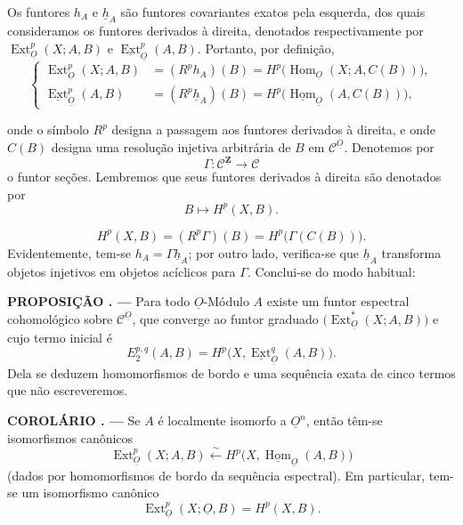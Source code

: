 \documentclass[11pt,twoside,openany]{book}
\numberwithin{equation}{section}
\newcommand{\src}[1]{%
  \phantomsection\hypertarget{src:#1}{}%
  \marginpar{\raggedleft\footnotesize\sffamily #1}%
}
\newcommand{\Osh}{\underline{O}}
\newcommand{\Zsh}{\underline{\mathbf Z}}
\newcommand{\Ccat}{\mathcal C}
\newcommand{\Homsh}{\underline{\operatorname{Hom}}}
\newcommand{\Extsh}{\underline{\operatorname{Ext}}}
\newcommand{\hsh}{\underline{h}}
\newcommand{\fquote}[1]{\textquotedbl#1\textquotedbl}
\theoremstyle{plain}
\theoremstyle{definition}
\theoremstyle{remark}
\newcommand{\result}[2]{%
  \par\medskip\noindent\textbf{#1%
  \if\relax\detokenize{#2}\relax\else\space#2\fi. ---}\enspace
}
\newcommand{\FgaUnitKey}{frontmatter}
\renewcommand{\src}[1]{%
  \phantomsection\hypertarget{src:\FgaUnitKey:#1}{}%
  \marginpar{\raggedleft\footnotesize\sffamily #1}%
}
\begin{document}
Os funtores $h_A$ e $\hsh_A$ são funtores covariantes exatos pela esquerda,
dos quais consideramos os funtores derivados à direita, denotados respectivamente por
$\operatorname{Ext}_{\Osh}^{p}(X;A,B)$ e $\Extsh_{\Osh}^{p}(A,B)$. Portanto,
por definição,
\begin{equation}\tag{1.2}
\left\{
\begin{aligned}
\operatorname{Ext}_{\Osh}^{p}(X;A,B)
  &= (R^{p}h_A)(B)
   = H^{p}\bigl(\operatorname{Hom}_{\Osh}(X;A,C(B))\bigr),\\
\Extsh_{\Osh}^{p}(A,B)
  &= (R^{p}\hsh_A)(B)
   = H^{p}\bigl(\Homsh_{\Osh}(A,C(B))\bigr),
\end{aligned}
\right.
\end{equation}

onde o símbolo $R^{p}$ designa a passagem aos funtores derivados à direita, e onde
$C(B)$ designa uma resolução injetiva arbitrária de $B$ em $\Ccat^{\Osh}$.
Denotemos por
\[
  \Gamma:\Ccat^{\Zsh}\longrightarrow\Ccat
\]
o funtor \fquote{seções}. Lembremos que seus funtores derivados à direita são
denotados por
\[
  B\longmapsto H^{p}(X,B).
\]

\src{170}
\begin{equation}\tag{1.3}
  H^{p}(X,B)=(R^{p}\Gamma)(B)=H^{p}\bigl(\Gamma(C(B))\bigr).
\end{equation}
Evidentemente, tem-se $h_A=\Gamma\hsh_A$; por outro lado, verifica-se que $\hsh_A$
transforma objetos injetivos em objetos acíclicos para $\Gamma$. Conclui-se do
modo habitual:

\result{PROPOSIÇÃO}{1} Para todo $\Osh$-Módulo $A$ existe um funtor
espectral cohomológico sobre $\Ccat^{\Osh}$, que converge ao funtor graduado
$\bigl(\operatorname{Ext}_{\Osh}^{*}(X;A,B)\bigr)$ e cujo termo inicial é
\begin{equation}\tag{1.4}
  E_{2}^{p,q}(A,B)=H^{p}\bigl(X,\Extsh_{\Osh}^{q}(A,B)\bigr).
\end{equation}
Dela se deduzem \fquote{homomorfismos de bordo} e uma sequência exata de cinco termos
que não escreveremos.

\result{COROLÁRIO}{1} Se $A$ é localmente isomorfo a $\Osh^{n}$, então têm-se
isomorfismos canônicos
\begin{equation}\tag{1.5}
  \operatorname{Ext}_{\Osh}^{p}(X;A,B)
  \overset{\sim}{\longleftarrow}
  H^{p}\bigl(X,\Homsh_{\Osh}(A,B)\bigr)
\end{equation}
(dados por homomorfismos de bordo da sequência espectral). Em particular, tem-se
um isomorfismo canônico
\begin{equation}\tag{1.6}
  \operatorname{Ext}_{\Osh}^{p}(X;\Osh,B)=H^{p}(X,B).
\end{equation}
\end{document}
